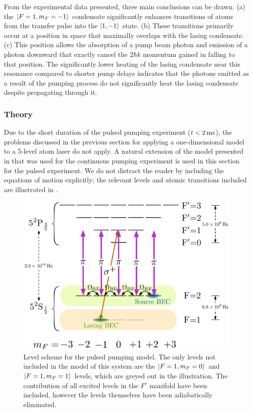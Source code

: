 From the experimental data presented, three main conclusions can be drawn: (a) the ${\left|F=1, m_F=-1\right>}$ condensate significantly enhances transitions of atoms from the transfer pulse into the ${\left|1, -1\right>}$ state. (b) These transitions primarily occur at a position in space that maximally overlaps with the lasing condensate. (c) This position allows the absorption of a pump beam photon and emission of a photon downward that exactly cancel the $2 \hbar k$ momentum gained in falling to that position.  The significantly lower heating of the lasing condensate near this resonance compared to shorter pump delays indicates that the photons emitted as a result of the pumping process do not significantly heat the lasing condensate despite propagating through it.

\subsubsection{Theory}

Due to the short duration of the pulsed pumping experiment ($t < \unit[2]{ms}$), the problems discussed in the previous section for applying a one-dimensional model to a 5-level atom laser do not apply.  A natural extension of the model presented in  that was used for the continuous pumping experiment is used in this section for the pulsed experiment.  We do not distract the reader by including the equations of motion explicitly; the relevant levels and atomic transitions included are illustrated in .

\begin{figure}
    \centering
    \includegraphics[width=12cm]{PulsedPumpingLevelDiagram}
    \caption{Level scheme for the pulsed pumping model.  The only levels not included in the model of this system are the ${\left|F=1, m_F=0\right>}$ and ${\left|F=1, m_F=1\right>}$ levels, which are greyed out in the illustration.  The contribution of all excited levels in the $F'$ manifold have been included, however the levels themselves have been adiabatically eliminated.}
    \label{OpticalPumping:PulsedPumpingLevelDiagram}
\end{figure}

